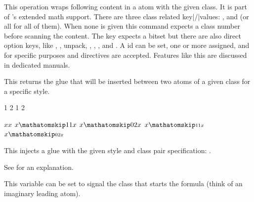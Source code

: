 \stopoldprimitive

\startnewprimitive[title={\prm {mathatom}}]

This operation wraps following content in a atom with the given class. It is part
of \LUAMETATEX's extended math support. There are three class related
key|/|values: ,  and  (or \type
{all} for all of them). When none is given this command expects a class number
before scanning the content. The  key expects a bitset but there
are also direct option keys, like , , \type
{unpack}, , , ,  and
. A  id can be set, one or more 
assigned, and for specific purposes  and 
directives are accepted. Features like this are discussed in dedicated manuals.

\stopnewprimitive

\startnewprimitive[title={\prm {mathatomglue}}]

This returns the glue that will be inserted between two atoms of a given class
for a specific style.

\startbuffer
\the\mathatomglue {} 1
\the\mathatomglue {} 2
\the\mathatomglue {} 1
\the\mathatomglue {} 2
\stopbuffer

\typebuffer

\startlines \tttf
\getbuffer
\stoplines

\stopnewprimitive

\startnewprimitive[title={\prm {mathatomskip}}]

\startbuffer
$x x$
$x \mathatomskip \textstyle   1 1 x$
$x \mathatomskip \textstyle   0 2 x$
$x \mathatomskip \scriptstyle 1 1 x$
$x \mathatomskip \scriptstyle 0 2 x$
\stopbuffer

This injects a glue with the given style and class pair specification:
\inlinebuffer.

\typebuffer

\stopnewprimitive

\startnewprimitive[title={\prm {mathbackwardpenalties}}]

See  for an explanation.

\stopnewprimitive

\startnewprimitive[title={\prm {mathbeginclass}}]

This variable can be set to signal the class that starts the formula (think of an
imaginary leading atom).

